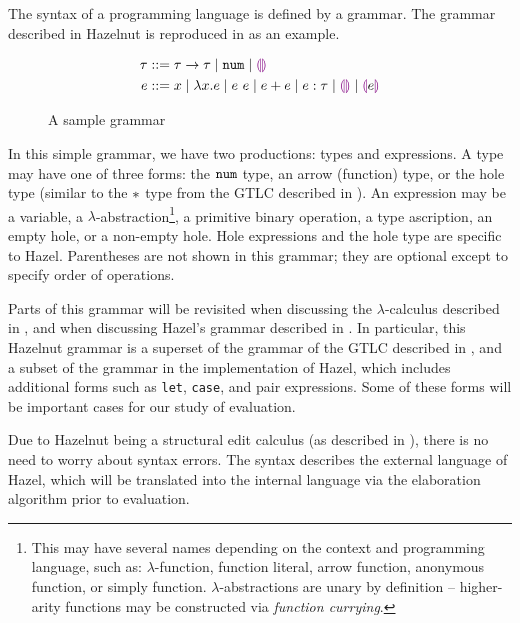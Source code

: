 The syntax of a programming language is defined by a grammar. The grammar described in Hazelnut \cite{conf/popl/Hazelnut17} is reproduced in  as an example.

\begin{figure}
  \centering
  \begin{mdframed}
    \begin{singlespace}
      \begin{align*}
        \tau &::= \tau\to\tau
               \mid\mathtt{num}
               \mid\textcolor{violet}{\llparenthesis}\textcolor{violet}{\rrparenthesis} \\
        e &::= x
            \mid\lambda x.e
            \mid e\ e
            \mid e+e
            \mid e:\tau
            \mid\textcolor{violet}{\llparenthesis}\textcolor{violet}{\rrparenthesis}
            \mid\textcolor{violet}{\llparenthesis} e\textcolor{violet}{\rrparenthesis}
      \end{align*}
    \end{singlespace}
  \end{mdframed}
  \caption{A sample grammar}
  \label{fig:sample-grammar}
\end{figure}

In this simple grammar, we have two productions: types and expressions. A type may have one of three forms: the $\mathtt{num}$ type, an arrow (function) type, or the hole type (similar to the $*$ type from the GTLC described in ). An expression may be a variable, a $\lambda$-abstraction\footnote{This may have several names depending on the context and programming language, such as: $\lambda$-function, function literal, arrow function, anonymous function, or simply function. $\lambda$-abstractions are unary by definition -- higher-arity functions may be constructed via \textit{function currying}.}, a primitive binary operation, a type ascription, an empty hole, or a non-empty hole. Hole expressions and the hole type are specific to Hazel. Parentheses are not shown in this grammar; they are optional except to specify order of operations.

Parts of this grammar will be revisited when discussing the $\lambda$-calculus described in , and when discussing Hazel's grammar described in . In particular, this Hazelnut grammar is a superset of the grammar of the GTLC described in , and a subset of the grammar in the implementation of Hazel, which includes additional forms such as \texttt{let}, \texttt{case}, and pair expressions. Some of these forms will be important cases for our study of evaluation.

Due to Hazelnut being a structural edit calculus (as described in ), there is no need to worry about syntax errors. The syntax describes the external language of Hazel, which will be translated into the internal language via the elaboration algorithm prior to evaluation.

